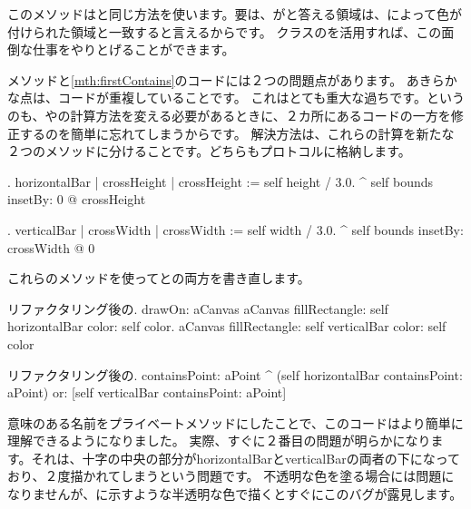 \documentclass[a4paper,10pt,twoside]{book}
\begin{document}
このメソッドはと同じ方法を使います。要は、がと答える領域は、によって色が付けられた領域と一致すると言えるからです。
クラスのを活用すれば、この面倒な仕事をやりとげることができます。

メソッドと\ref{mth:firstContains}のコードには２つの問題点があります。
あきらかな点は、コードが重複していることです。
これはとても重大な過ちです。というのも、やの計算方法を変える必要があるときに、２カ所にあるコードの一方を修正するのを簡単に忘れてしまうからです。
解決方法は、これらの計算を新たな２つのメソッドに分けることです。どちらもプロトコルに格納します。

\begin{method}{.}
horizontalBar
	| crossHeight |
	crossHeight := self height / 3.0.
	^ self bounds insetBy: 0 @ crossHeight
\end{method}

\begin{method}{.}
verticalBar
	| crossWidth |
	crossWidth := self width / 3.0.
	^ self bounds insetBy: crossWidth @ 0
\end{method}

\noindent
これらのメソッドを使ってとの両方を書き直します。

\begin{method}{リファクタリング後の.}
drawOn: aCanvas 
	aCanvas fillRectangle: self horizontalBar color: self color.
	aCanvas fillRectangle: self verticalBar color: self color
\end{method}

\begin{method}{リファクタリング後の.}
containsPoint: aPoint 
	^ (self horizontalBar containsPoint: aPoint)
		or: [self verticalBar containsPoint: aPoint]
\end{method}

意味のある名前をプライベートメソッドにしたことで、このコードはより簡単に理解できるようになりました。
実際、すぐに２番目の問題が明らかになります。それは、十字の中央の部分がhorizontalBarとverticalBarの両者の下になっており、２度描かれてしまうという問題です。
不透明な色を塗る場合には問題になりませんが、に示すような半透明な色で描くとすぐにこのバグが露見します。
\end{document}
